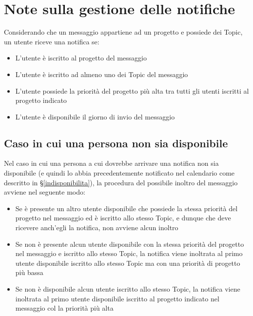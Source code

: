 \section{Note sulla gestione delle notifiche}\label{note}
Considerando che un messaggio appartiene ad un progetto e possiede dei Topic, un utente riceve una notifica se:
\begin{itemize}
    \item L'utente è iscritto al progetto del messaggio
    \item L'utente è iscritto ad almeno uno dei Topic del messaggio
    \item L'utente possiede la priorità del progetto più alta tra tutti gli utenti iscritti al progetto indicato
    \item L'utente è disponibile il giorno di invio del messaggio
\end{itemize}

\subsection{Caso in cui una persona non sia disponibile}
Nel caso in cui una persona a cui dovrebbe arrivare una notifica non sia disponibile (e quindi lo abbia precedentemente notificato nel calendario come descritto in \S\ref{indisponibilita}), la procedura del possibile inoltro del messaggio avviene nel seguente modo:
\begin{itemize}
    \item Se è presente un altro utente disponibile che possiede la stessa priorità del progetto nel messaggio ed è iscritto allo stesso Topic, e dunque che deve ricevere anch'egli la notifica, non avviene alcun inoltro
    \item Se non è presente alcun utente disponibile con la stessa priorità del progetto nel messaggio e iscritto allo stesso Topic, la notifica viene inoltrata al primo utente disponibile iscritto allo stesso Topic ma con una priorità di progetto più bassa
    \item Se non è disponibile alcun utente iscritto allo stesso Topic, la notifica viene inoltrata al primo utente disponibile iscritto al progetto indicato nel messaggio col la priorità più alta
\end{itemize}
